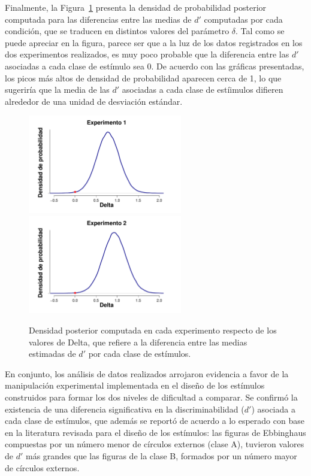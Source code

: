 Finalmente, la Figura~\ref{fig:Delta} presenta la densidad de probabilidad posterior computada para las diferencias entre las medias de $d'$ computadas por cada condición, que se traducen en distintos valores del parámetro $\delta$. Tal como se puede apreciar en la figura, parece ser que a la luz de los datos registrados en los dos experimentos realizados, es muy poco probable que la diferencia entre las $d'$ asociadas a cada clase de estímulo sea 0. De acuerdo con las gráficas presentadas, los picos más altos de densidad de probabilidad aparecen cerca de 1, lo que sugeriría que la media de las $d'$ asociadas a cada clase de estíimulos difieren alrededor de una unidad de desviación estándar.\\

\begin{figure}[th]
\centering
\includegraphics[width=0.6\textwidth]{Figures/MDelta_DensidadDelta_E1}\\
\includegraphics[width=0.6\textwidth]{Figures/MDelta_DensidadDelta_E2}\\
\caption[Modelo Delta: Densidad posterior de los valores estimados para el parámetro Delta en cada Experimento]{Densidad posterior computada en cada experimento respecto de los valores de Delta, que refiere a la diferencia entre las medias estimadas de $d'$ por cada clase de estímulos.}
\label{fig:Delta}
\end{figure}

En conjunto, los análisis de datos realizados arrojaron evidencia a favor de la manipulación experimental implementada en el diseño de los estímulos construidos para formar los dos niveles de dificultad a comparar. Se confirmó la existencia de una diferencia significativa en la discriminabilidad ($d'$) asociada a cada clase de estímulos, que además se reportó de acuerdo a lo esperado con base en la literatura revisada para el diseño de los estímulos: las figuras de Ebbinghaus compuestas por un número menor de círculos externos (clase A), tuvieron valores de $d'$ más grandes que las figuras de la clase B, formados por un número mayor de círculos externos.\\

